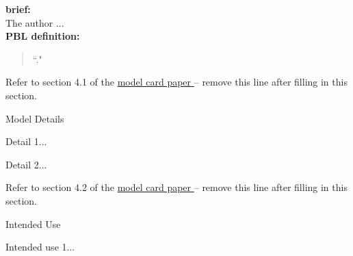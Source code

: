 \documentclass{article}
\begin{document}
\begin{adjustwidth}{-60pt}{-30pt}
\begin{singlespace}
\begin{minipage}{1.26\textwidth}
\begin{pabox}[label={myusecounter}]{\hfill  \cite{Fernandes2021}}
\tcblower





%

\end{pabox}
\end{minipage}

\begin{minipage}{1.26\textwidth}

\begin{pabox}[label={myusecounter}]{\hfill  \cite{Hung2021}}

\textbf{brief:} \\

The author ...\\

\textbf{PBL definition:}
\begin{quote}
 ``."
\end{quote} 



\tcblower





\end{pabox}
\end{minipage}


\begin{tcolorbox}[title=\textbf{Model Card - CheXNet},
    breakable, sharp corners, boxrule=0.7pt]

\small{

Refer to section 4.1 of the \href{https://arxiv.org/abs/1810.03993}{model card paper } -- remove this line after filling in this section.

\begin{mcsection}{Model Details}
    \item Detail 1...
    \item Detail 2...
\end{mcsection}

Refer to section 4.2 of the \href{https://arxiv.org/abs/1810.03993}{model card paper } -- remove this line after filling in this section.

\begin{mcsection}{Intended Use}
    \item Intended use 1...
\end{mcsection}

}
\end{tcolorbox}
\end{singlespace}
\end{adjustwidth}
\end{document}
